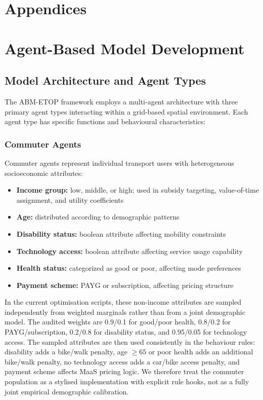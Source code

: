 \appendix
\section*{Appendices}
\renewcommand{\thesection}{A\arabic{section}}
\setcounter{section}{0}

\section{Agent-Based Model Development}
\label{app:abm_development}

\subsection{Model Architecture and Agent Types}
The ABM-ETOP framework employs a multi-agent architecture with three primary agent types interacting within a grid-based spatial environment. Each agent type has specific functions and behavioural characteristics:

\subsubsection{Commuter Agents}
Commuter agents represent individual transport users with heterogeneous socioeconomic attributes:
\begin{itemize}
    \item \textbf{Income group:} low, middle, or high; used in subsidy targeting, value-of-time assignment, and utility coefficients
    \item \textbf{Age:} distributed according to demographic patterns
    \item \textbf{Disability status:} boolean attribute affecting mobility constraints
    \item \textbf{Technology access:} boolean attribute affecting service usage capability
    \item \textbf{Health status:} categorized as good or poor, affecting mode preferences
    \item \textbf{Payment scheme:} PAYG or subscription, affecting pricing structure
\end{itemize}

In the current optimisation scripts, these non-income attributes are sampled independently from weighted marginals rather than from a joint demographic model. The audited weights are 0.9/0.1 for good/poor health, 0.8/0.2 for PAYG/subscription, 0.2/0.8 for disability status, and 0.95/0.05 for technology access. The sampled attributes are then used consistently in the behaviour rules: disability adds a bike/walk penalty, age $\geq 65$ or poor health adds an additional bike/walk penalty, no technology access adds a car/bike access penalty, and payment scheme affects MaaS pricing logic. We therefore treat the commuter population as a stylised implementation with explicit rule hooks, not as a fully joint empirical demographic calibration.

